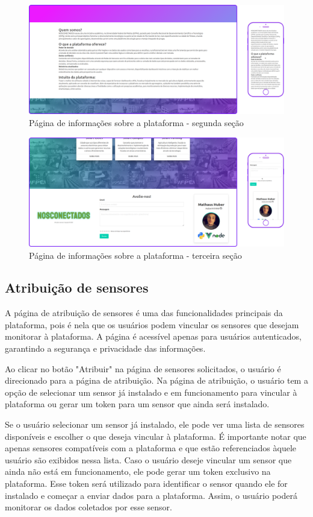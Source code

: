 \documentclass[tcc,capa]{texufpel}
\begin{document}
\begin{figure}[htbp]
  \centering \includegraphics[scale=.2]{assets/sobre2.png}
  \caption{Página de informações sobre a plataforma - segunda seção}
  \label{sobre-2}
\end{figure}

\begin{figure}[htbp]
  \centering \includegraphics[scale=.2]{assets/sobre3.png}
  \caption{Página de informações sobre a plataforma - terceira seção}
  \label{sobre-3}
\end{figure}
\newpage
\subsection{Atribuição de sensores}
A página de atribuição de sensores é uma das funcionalidades principais da plataforma, pois é nela que os usuários podem vincular os sensores que desejam monitorar à plataforma. A página é acessível apenas para usuários autenticados, garantindo a segurança e privacidade das informações.

Ao clicar no botão "Atribuir" \space na página de sensores solicitados, o usuário é direcionado para a página de atribuição. Na página de atribuição, o usuário tem a opção de selecionar um sensor já instalado e em funcionamento para vincular à plataforma ou gerar um token para um sensor que ainda será instalado.

Se o usuário selecionar um sensor já instalado, ele pode ver uma lista de sensores disponíveis e escolher o que deseja vincular à plataforma. É importante notar que apenas sensores compatíveis com a plataforma e que estão referenciados àquele usuário são exibidos nessa lista. Caso o usuário deseje vincular um sensor que ainda não está em funcionamento, ele pode gerar um token exclusivo na plataforma. Esse token será utilizado para identificar o sensor quando ele for instalado e começar a enviar dados para a plataforma. Assim, o usuário poderá monitorar os dados coletados por esse sensor.
\end{document}

